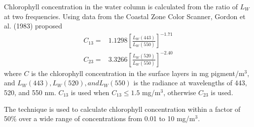 Chlorophyll concentration in the water column is calculated from the ratio of
$L_W$ at two frequencies. Using data from the Coastal Zone Color
Scanner, Gordon et al. (1983) proposed
\begin{subequations}
\begin{align}
C_{13} = & 1.1298 \left[ \frac{L_W(443)}{L_W(550)}\right]^{-1.71}\\
C_{23} = & 3.3266 \left[ \frac{L_W(520)}{L_W(550)}\right]^{-2.40}
\end{align}
\end{subequations}
where $C$ is the chlorophyll concentration in the surface layers in mg
pigment/m$^3$, and $L_W(443), L_W(520), and L_W(550)$ is the radiance
at wavelengths of 443, 520, and 550 nm.  $C_{13}$ is used when $C_{13}
\le 1.5$ mg/m$^3$, otherwise $C_{23}$ is used.

The technique is used to calculate chlorophyll concentration within a
factor of 50\% over a wide range of concentrations from 0.01 to 10
mg/m$^3$.

